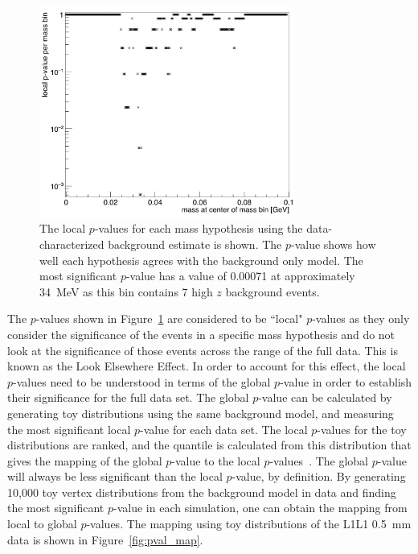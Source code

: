 \begin{figure}[htb]
  \centering
      \includegraphics[width=0.75\textwidth]{pics/results/highz_pval.png}
  \caption[Local $p$--values for the L1L1 dataset]{The local $p$-values for each mass hypothesis using the data-characterized background estimate is shown. The $p$-value shows how well each hypothesis agrees with the background only model. The most significant $p$-value has a value of 0.00071 at approximately 34~MeV as this bin contains 7 high $z$ background events.}
  \label{fig:highz_pval}
\end{figure} 
The $p$-values shown in Figure~\ref{fig:highz_pval} are considered to be ``local" $p$-values as they only consider the significance of the events in a specific mass hypothesis and do not look at the significance of those events across the range of the full data. This is known as the Look Elsewhere Effect. In order to account for this effect, the local $p$-values need to be understood in terms of the global $p$-value in order to establish their significance for the full data set. The global $p$-value can be calculated by generating toy distributions using the same background model, and measuring the most significant local $p$-value for each data set. The local $p$-values for the toy distributions are ranked, and the quantile is calculated from this distribution that gives the mapping of the global $p$-value to the local $p$-values~\cite{gross_trial_2010}. The global $p$-value will always be less significant than the local $p$-value, by definition. By generating 10,000 toy vertex distributions from the background model in data and finding the most significant $p$-value in each simulation, one can obtain the mapping from local to global $p$-values. The mapping using toy distributions of the L1L1 0.5~mm data is shown in Figure~\ref{fig:pval_map}.

